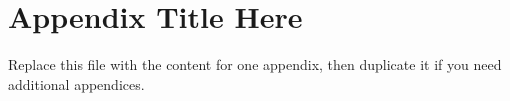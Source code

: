 
\chapter{Appendix Title Here}
\label{AppendixX}

Replace this file with the content for one appendix, then duplicate it if you need additional appendices.